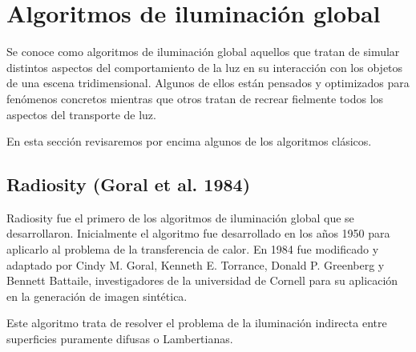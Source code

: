 \section{Algoritmos de iluminación global}

Se conoce como algoritmos de iluminación global aquellos que tratan de simular distintos aspectos del comportamiento de la luz en su interacción con los objetos de una escena tridimensional. Algunos de ellos están pensados y optimizados para fenómenos concretos mientras que otros tratan de recrear fielmente todos los aspectos del transporte de luz.

En esta sección revisaremos por encima algunos de los algoritmos clásicos.

 
\subsection{Radiosity (Goral et al. 1984)}

Radiosity fue el primero de los algoritmos de iluminación global que se desarrollaron. Inicialmente el algoritmo fue desarrollado en los años 1950 para aplicarlo al problema de la transferencia de calor. En 1984 fue modificado y adaptado por Cindy M. Goral, Kenneth E. Torrance, Donald P. Greenberg y Bennett Battaile, investigadores de la universidad de Cornell para su aplicación en la generación de imagen sintética.

Este algoritmo trata de resolver el problema de la iluminación indirecta entre superficies puramente difusas o Lambertianas.
